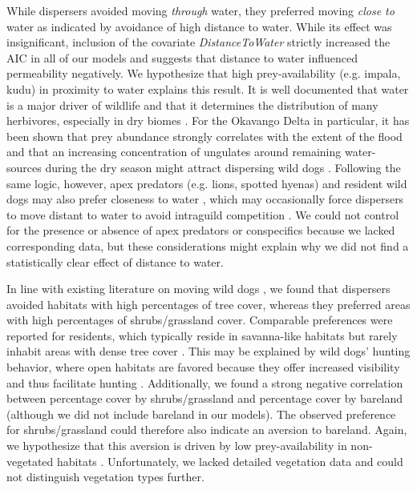\documentclass[abstract=on,10pt,a4paper,bibliography=totocnumbered]{scrartcl}
\begin{document}
While dispersers avoided moving \textit{through} water, they preferred moving
\textit{close to} water as indicated by avoidance of high distance to water.
While its effect was insignificant, inclusion of the covariate
\textit{DistanceToWater} strictly increased the AIC in all of our models and
suggests that distance to water influenced permeability negatively. We
hypothesize that high prey-availability (e.g. impala, kudu) in proximity to
water explains this result. It is well documented that water is a major driver
of wildlife and that it determines the distribution of many herbivores,
especially in dry biomes \citep{Western.1975}. For the Okavango Delta in
particular, it has been shown that prey abundance strongly correlates with the
extent of the flood \citep{Bonyongo.2005} and that an increasing concentration
of ungulates around remaining water-sources during the dry season might attract
dispersing wild dogs \citep{Ogutu.2014}. Following the same logic, however, apex
predators (e.g. lions, spotted hyenas) and resident wild dogs may also prefer
closeness to water \citep{Valeix.2009}, which may occasionally force dispersers
to move distant to water \citep{Ndaimani.2016} to avoid intraguild competition
\citep{Creel.1996, Mills.1997}. We could not control for the presence or absence
of apex predators or conspecifics because we lacked corresponding data, but
these considerations might explain why we did not find a statistically clear
effect of distance to water.

In line with existing literature on moving wild dogs \citep{Abrahms.2017}, we
found that dispersers avoided habitats with high percentages of tree cover,
whereas they preferred areas with high percentages of shrubs/grassland cover.
Comparable preferences were reported for residents, which typically reside in
savanna-like habitats but rarely inhabit areas with dense tree cover
\citep{Estes.2012}. This may be explained by wild dogs' hunting behavior, where
open habitats are favored because they offer increased visibility and thus
facilitate hunting \citep{Estes.1967}. Additionally, we found a strong negative
correlation between percentage cover by shrubs/grassland and percentage cover by
bareland (although we did not include bareland in our models). The observed
preference for shrubs/grassland could therefore also indicate an aversion to
bareland. Again, we hypothesize that this aversion is driven by low
prey-availability in non-vegetated habitats \citep{Pettorelli.2011}.
Unfortunately, we lacked detailed vegetation data and could not distinguish
vegetation types further.
\end{document}
